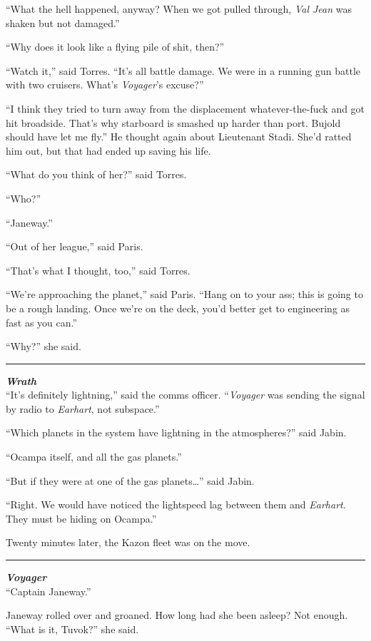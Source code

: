 \documentclass[twoside,letterpaper,12pt]{memoir}
\begin{document}
``What the hell happened, anyway? When we got pulled through, \textit{Val Jean} was shaken but not damaged.''

``Why does it look like a flying pile of shit, then?''

``Watch it,'' said Torres. ``It’s all battle damage. We were in a running gun battle with two cruisers. What's \textit{Voyager}'s excuse?''

``I think they tried to turn away from the displacement whatever-the-fuck and got hit broadside. That’s why starboard is smashed up harder than port. Bujold should have let me fly.'' He thought again about Lieutenant Stadi. She’d ratted him out, but that had ended up saving his life.

``What do you think of her?'' said Torres.

``Who?''

``Janeway.''

``Out of her league,'' said Paris.

``That's what I thought, too,'' said Torres.

``We're approaching the planet,'' said Paris. ``Hang on to your ass; this is going to be a rough landing. Once we're on the deck, you'd better get to engineering as fast as you can.''

``Why?'' she said.

\fancybreak{\rule{3cm}{0.4 pt}}
\noindent\textit{\textbf{Wrath}}\\

``It's definitely lightning,'' said the comms officer. ``\textit{Voyager} was sending the signal by radio to \textit{Earhart}, not subspace.''

``Which planets in the system have lightning in the atmospheres?'' said Jabin.

``Ocampa itself, and all the gas planets.''

``But if they were at one of the gas planets\ldots '' said Jabin.

``Right. We would have noticed the lightspeed lag between them and \textit{Earhart}. They must be hiding on Ocampa.''

Twenty minutes later, the Kazon fleet was on the move.

\fancybreak{\rule{3cm}{0.4 pt}}
\noindent\textit{\textbf{Voyager}}\\

``Captain Janeway.''

Janeway rolled over and groaned. How long had she been asleep? Not enough. ``What is it, Tuvok?'' she said.
\end{document}
